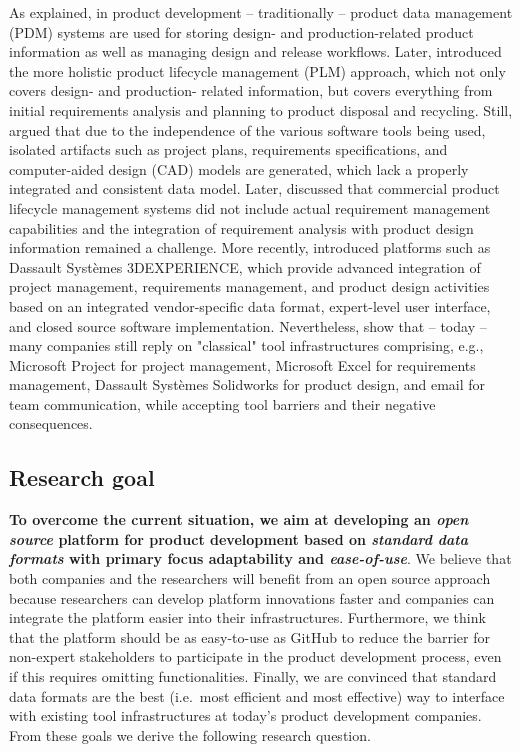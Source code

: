 As \cite{TonyLiu2001} explained, in product development -- traditionally -- product data management (PDM) systems are used for storing design- and production-related product information as well as managing design and release workflows.
Later, \cite{Grieves2005} introduced the more holistic product lifecycle management (PLM) approach, which not only covers design- and production- related information, but covers everything from initial requirements analysis and planning to product disposal and recycling.
Still, \cite{Houshmand2010} argued that due to the independence of the various software tools being used, isolated artifacts such as project plans, requirements specifications, and computer-aided design (CAD) models are generated, which lack a properly integrated and consistent data model.
Later, \cite{Jorma2014} discussed that commercial product lifecycle management systems did not include actual requirement management capabilities and the integration of requirement analysis with product design information remained a challenge.
More recently, \cite{Barth2013} introduced platforms such as Dassault Systèmes 3DEXPERIENCE, which provide advanced integration of project management, requirements management, and product design activities based on an integrated vendor-specific data format, expert-level user interface, and closed source software implementation.
Nevertheless, \cite{Marion2021} show that -- today -- many companies still reply on "classical" tool infrastructures comprising, e.g., Microsoft Project for project management, Microsoft Excel for requirements management, Dassault Systèmes Solidworks for product design, and email for team communication, while accepting tool barriers and their negative consequences.

\subsection{Research goal}

\textbf{To overcome the current situation, we aim at developing an \textit{open source} platform for product development based on \textit{standard data formats} with primary focus adaptability and \textit{ease-of-use}}.
We believe that both companies and the researchers will benefit from an open source approach because researchers can develop platform innovations faster and companies can integrate the platform easier into their infrastructures.
Furthermore, we think that the platform should be as easy-to-use as GitHub to reduce the barrier for non-expert stakeholders to participate in the product development process, even if this requires omitting functionalities.
Finally, we are convinced that standard data formats are the best (i.e.\ most efficient and most effective) way to interface with existing tool infrastructures at today's product development companies.
From these goals we derive the following research question.

